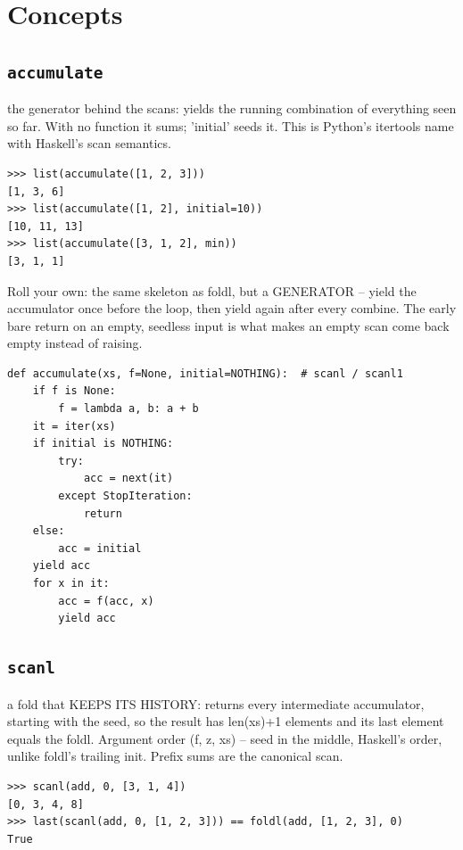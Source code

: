 \documentclass[10pt,letterpaper]{book}
\begin{document}
\section{Concepts}
\subsection{\texttt{accumulate}}\label{def:accumulate}
the generator behind the scans: yields the running combination of everything seen so far. With no function it sums; 'initial' seeds it. This is Python's itertools name with Haskell's scan semantics.
\begin{lstlisting}[style=ex]
>>> list(accumulate([1, 2, 3]))
[1, 3, 6]
>>> list(accumulate([1, 2], initial=10))
[10, 11, 13]
>>> list(accumulate([3, 1, 2], min))
[3, 1, 1]
\end{lstlisting}

Roll your own: the same skeleton as foldl, but a GENERATOR -- yield the accumulator once before the loop, then yield again after every combine. The early bare return on an empty, seedless input is what makes an empty scan come back empty instead of raising.

\begin{lstlisting}[style=ex]
def accumulate(xs, f=None, initial=NOTHING):  # scanl / scanl1
    if f is None:
        f = lambda a, b: a + b
    it = iter(xs)
    if initial is NOTHING:
        try:
            acc = next(it)
        except StopIteration:
            return
    else:
        acc = initial
    yield acc
    for x in it:
        acc = f(acc, x)
        yield acc
\end{lstlisting}

\subsection{\texttt{scanl}}\label{def:scanl}
a fold that KEEPS ITS HISTORY: returns every intermediate accumulator, starting with the seed, so the result has len(xs)+1 elements and its last element equals the foldl. Argument order (f, z, xs) -- seed in the middle, Haskell's order, unlike foldl's trailing init. Prefix sums are the canonical scan.
\begin{lstlisting}[style=ex]
>>> scanl(add, 0, [3, 1, 4])
[0, 3, 4, 8]
>>> last(scanl(add, 0, [1, 2, 3])) == foldl(add, [1, 2, 3], 0)
True
\end{lstlisting}
\end{document}
